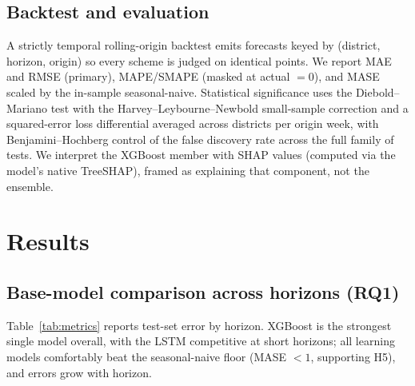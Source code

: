 \documentclass[11pt]{article}
\begin{document}
\subsection{Backtest and evaluation}
A strictly temporal rolling-origin backtest emits forecasts keyed by (district, horizon, origin) so
every scheme is judged on identical points. We report MAE and RMSE (primary), MAPE/SMAPE (masked at
actual $=0$), and MASE scaled by the in-sample seasonal-naive. Statistical significance uses the
Diebold--Mariano test with the Harvey--Leybourne--Newbold small-sample correction and a squared-error
loss differential averaged across districts per origin week, with Benjamini--Hochberg control of the
false discovery rate across the full family of tests. We interpret the XGBoost member with SHAP
values (computed via the model's native TreeSHAP), framed as explaining that component, not the
ensemble.

\section{Results}
\subsection{Base-model comparison across horizons (RQ1)}
Table~\ref{tab:metrics} reports test-set error by horizon. XGBoost is the strongest single model
overall, with the LSTM competitive at short horizons; all learning models comfortably beat the
seasonal-naive floor (MASE $<1$, supporting H5), and errors grow with horizon.
\end{document}
